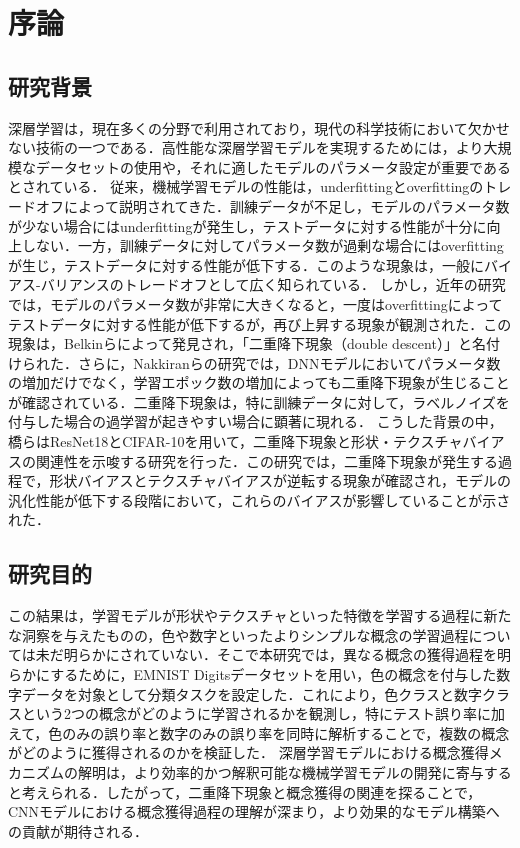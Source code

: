 \chapter{序論}
\section{研究背景}
深層学習は，現在多くの分野で利用されており，現代の科学技術において欠かせない技術の一つである．高性能な深層学習モデルを実現するためには，より大規模なデータセットの使用や，それに適したモデルのパラメータ設定が重要であるとされている．
従来，機械学習モデルの性能は，underfittingとoverfittingのトレードオフによって説明されてきた．訓練データが不足し，モデルのパラメータ数が少ない場合にはunderfittingが発生し，テストデータに対する性能が十分に向上しない．一方，訓練データに対してパラメータ数が過剰な場合にはoverfittingが生じ，テストデータに対する性能が低下する．このような現象は，一般にバイアス-バリアンスのトレードオフとして広く知られている\cite{Rajnarayan2017-ml}．
しかし，近年の研究では，モデルのパラメータ数が非常に大きくなると，一度はoverfittingによってテストデータに対する性能が低下するが，再び上昇する現象が観測された．この現象は，Belkinら\cite{Belkin2018-yx}によって発見され，「二重降下現象（double descent）」と名付けられた．さらに，Nakkiranらの研究では，DNNモデルにおいてパラメータ数の増加だけでなく，学習エポック数の増加によっても二重降下現象が生じることが確認されている\cite{Nakkiran2021-vf}．二重降下現象は，特に訓練データに対して，ラベルノイズを付与した場合の過学習が起きやすい場合に顕著に現れる．
こうした背景の中，橋ら\cite{DD_STB}はResNet18とCIFAR-10を用いて，二重降下現象と形状・テクスチャバイアスの関連性を示唆する研究を行った．この研究では，二重降下現象が発生する過程で，形状バイアスとテクスチャバイアスが逆転する現象が確認され，モデルの汎化性能が低下する段階において，これらのバイアスが影響していることが示された．

\section{研究目的}
この結果は，学習モデルが形状やテクスチャといった特徴を学習する過程に新たな洞察を与えたものの，色や数字といったよりシンプルな概念の学習過程については未だ明らかにされていない．そこで本研究では，異なる概念の獲得過程を明らかにするために，EMNIST Digitsデータセットを用い，色の概念を付与した数字データを対象として分類タスクを設定した．これにより，色クラスと数字クラスという2つの概念がどのように学習されるかを観測し，特にテスト誤り率に加えて，色のみの誤り率と数字のみの誤り率を同時に解析することで，複数の概念がどのように獲得されるのかを検証した．
深層学習モデルにおける概念獲得メカニズムの解明は，より効率的かつ解釈可能な機械学習モデルの開発に寄与すると考えられる．したがって，二重降下現象と概念獲得の関連を探ることで，CNNモデルにおける概念獲得過程の理解が深まり，より効果的なモデル構築への貢献が期待される．

